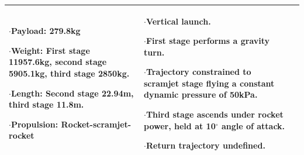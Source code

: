 {\begin{landscape}
\begin{xltabular}{\linewidth}{|X|X|X|}
	$\cdot$Payload: 279.8kg
	
	$\cdot$Weight: First stage 11957.6kg, second stage 5905.1kg, third stage 2850kg.
	
	$\cdot$Length: Second stage 22.94m, third stage 11.8m. 
	
	$\cdot$Propulsion: Rocket-scramjet-rocket
	
	
	&\small
	
	
	$\cdot$Vertical launch.
	
	$\cdot$First stage performs a gravity turn. 
	
	$\cdot$Trajectory constrained to scramjet stage flying a constant dynamic pressure of 50kPa. 
	
	$\cdot$Third stage ascends under rocket power, held at 10$^\circ$ angle of attack. 
	
	$\cdot$Return trajectory undefined. 
	
	\\
	\hline
\end{xltabular}

\end{landscape}
}

